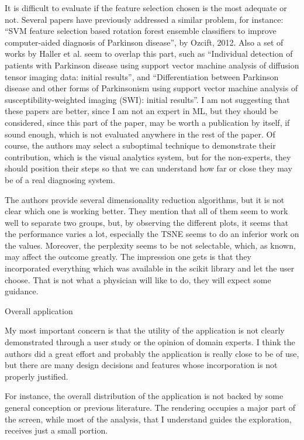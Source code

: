     It is difficult to evaluate if the feature selection chosen is the most adequate
    or not. Several papers have previously addressed a similar problem, for instance:
    “SVM feature selection based rotation forest ensemble classifiers to improve
    computer-aided diagnosis of Parkinson disease”, by Ozcift, 2012.
    Also a set of works by Haller et al. seem to overlap this part, such as
    “Individual detection of patients with Parkinson disease using support vector
    machine analysis of diffusion tensor imaging data: initial results”, and
    “Differentiation between Parkinson disease and other forms of Parkinsonism using
    support vector machine analysis of susceptibility-weighted imaging (SWI): initial
    results”. I am not suggesting that these papers are better, since I am not an
    expert in ML, but they should be considered, since this part of the paper, may be
    worth a publication by itself, if sound enough, which is not evaluated anywhere in
    the rest of the paper. Of course, the authors may select a suboptimal technique to
    demonstrate their contribution, which is the visual analytics system, but for the
    non-experts, they should position their steps so that we can understand how far or
    close they may be of a real diagnosing system.

    The authors provide several dimensionality reduction algorithms, but it is not
    clear which one is working better.
    They mention that all of them seem to work well to separate two groups, but, by
    observing the different plots, it seems that the performance varies a lot,
    especially the TSNE seems to do an inferior work on the values. Moreover, the
    perplexity seems to be not selectable, which, as known, may affect the outcome
    greatly. The impression one gets is that they incorporated everything which was
    available in the scikit library and let the user choose. That is not what a
    physician will like to do, they will expect some guidance.


    Overall application

    My most important concern is that the utility of the application is not clearly
    demonstrated through a user study or the opinion of domain experts. I think the
    authors did a great effort and probably the application is really close to be of
    use, but there are many design decisions and features whose incorporation is not
    properly justified.

    For instance, the overall distribution of the application is not backed by some
    general conception or previous literature. The rendering occupies a major part of
    the screen, while most of the analysis, that I understand guides the exploration,
    receives just a small portion.

